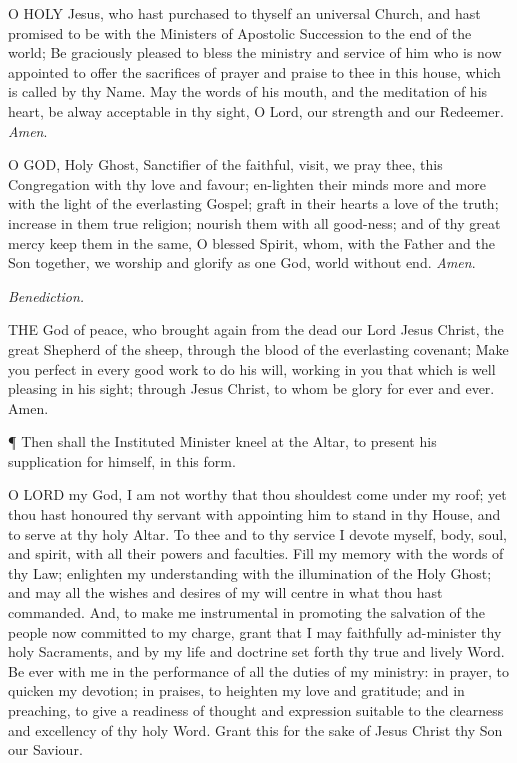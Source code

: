 O HOLY Jesus, who hast
purchased to thyself an universal Church, and hast promised to be with
the Ministers of Apostolic Succession to the end of the world; Be graciously
pleased to bless the ministry and service of him who is now appointed
to offer the sacrifices of prayer and praise to thee in this house, which
is called by thy Name. May the words of his mouth, and the meditation
of his heart, be alway acceptable in thy sight, O Lord, our strength and
our Redeemer. \emph{Amen}.

O GOD, Holy Ghost, Sanctifier
of the faithful, visit, we pray thee, this Congregation with thy love
and favour; en-lighten their minds more and more with the light of the
everlasting Gospel; graft in their hearts a love of the truth; increase
in them true religion; nourish them with all good-ness; and of thy great
mercy keep them in the same, O blessed Spirit, whom, with the Father and
the Son together, we worship and glorify as one God, world without end.
\emph{Amen}.

\emph{Benediction.}

THE
God of peace, who brought again from the dead our Lord Jesus Christ, the
great Shepherd of the sheep, through the blood of the everlasting covenant;
Make you perfect in every good work to do his will, working in you that
which is well pleasing in his sight; through Jesus Christ, to whom be
glory for ever and ever. Amen.

¶ Then shall the Instituted
Minister kneel at the Altar, to present his supplication for himself,
in this form.

O LORD my God, I am not
worthy that thou shouldest come under my roof; yet thou hast honoured
thy servant with appointing him to stand in thy House, and to serve at
thy holy Altar. To thee and to thy service I devote myself, body, soul,
and spirit, with all their powers and faculties. Fill my memory with the
words of thy Law; enlighten my understanding with the illumination of
the Holy Ghost; and may all the wishes and desires of my will centre in
what thou hast commanded. And, to make me instrumental in promoting the
salvation of the people now committed to my charge, grant that I may faithfully
ad-minister thy holy Sacraments, and by my life and doctrine set forth
thy true and lively Word. Be ever with me in the performance of all the
duties of my ministry: in prayer, to quicken my devotion; in praises,
to heighten my love and gratitude; and in preaching, to give a readiness
of thought and expression suitable to the clearness and excellency of
thy holy Word. Grant this for the sake of Jesus Christ thy Son our Saviour.

